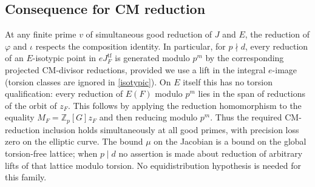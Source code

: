 \documentclass[11pt,a4paper]{article}
\newcommand{\Zp}{\mathbb Z_p}\newcommand{\Qp}{\mathbb Q_p}\newcommand{\Fp}{\mathbb F_p}\newcommand{\Q}{\mathbb Q}\newcommand{\Sha}{\operatorname{Sha}}\newcommand{\Sel}{\operatorname{Sel}}\newcommand{\Gal}{\operatorname{Gal}}\newcommand{\Tr}{\operatorname{Tr}}\newcommand{\rk}{\operatorname{rank}}\newcommand{\ord}{\operatorname{ord}}\newcommand{\Hom}{\operatorname{Hom}}\newcommand{\SL}{\operatorname{SL}}\newcommand{\GL}{\operatorname{GL}}\newcommand{\coker}{\operatorname{coker}}\newcommand{\length}{\operatorname{length}}\newcommand{\res}{\operatorname{res}}\newcommand{\cor}{\operatorname{cor}}\newcommand{\Id}{\operatorname{id}}
\numberwithin{equation}{section}
\begin{document}
\subsection{Consequence for CM reduction}
At any finite prime $v$ of simultaneous good reduction of $J$ and $E$, the reduction of $\varphi$ and $\iota$ respects the composition identity. In particular, for $p\nmid d$, every reduction of an $E$-isotypic point in $eJ_F^{\mathrm{tf}}$ is generated modulo $p^m$ by the corresponding projected CM-divisor reductions, provided we use a lift in the integral $e$-image (torsion classes are ignored in \eqref{isotypic}). On $E$ itself this has no torsion qualification: every reduction of $E(F)$ modulo $p^m$ lies in the span of reductions of the orbit of $z_F$. This follows by applying the reduction homomorphism to the equality $M_F=\Zp[G]z_F$ and then reducing modulo $p^m$. Thus the required CM-reduction inclusion holds simultaneously at all good primes, with precision loss zero on the elliptic curve. The bound $\mu$ on the Jacobian is a bound on the global torsion-free lattice; when $p\mid d$ no assertion is made about reduction of arbitrary lifts of that lattice modulo torsion. No equidistribution hypothesis is needed for this family.
\end{document}
